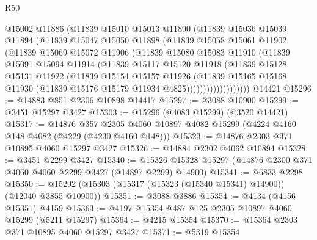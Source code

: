 \begin{lexlean}{R50}
\begin{coremodule}
                  @15002
                  @11886
                  (@11839
                    @15010
                    @15013
                    @11890
                    (@11839
                      @15036
                      @15039
                      @11894
                      (@11839
                        @15047
                        @15050
                        @11898
                        (@11839
                          @15058
                          @15061
                          @11902
                          (@11839
                            @15069
                            @15072
                            @11906
                            (@11839
                              @15080
                              @15083
                              @11910
                              (@11839
                                @15091
                                @15094
                                @11914
                                (@11839
                                  @15117
                                  @15120
                                  @11918
                                  (@11839
                                    @15128
                                    @15131
                                    @11922
                                    (@11839
                                      @15154
                                      @15157
                                      @11926
                                      (@11839
                                        @15165
                                        @15168
                                        @11930
                                        (@11839 @15176 @15179 @11934 @4825)))))))))))))))))))
    @14421
@15296 := @14883 @851 @2306 @10898 @14417
@15297 := @3088 @10900
@15299 := @3451 @15297 @3427
@15303 := @15296 (@4083 @15299) (@3520 @14421)
@15317 := @14876
    @357
    @2305
    @4060
    @10897
    @4082
    @15299
    (@4224 @4160 @148 @4082 (@4229 (@4230 @4160 @148)))
@15323 := @14876 @2303 @371 @10895 @4060 @15297 @3427
@15326 := @14884 @2302 @4062 @10894
@15328 := @3451 @2299 @3427
@15340 := @15326 @15328 @15297 (@14876 @2300 @371 @4060 @4060 @2299 @3427 (@14897 @2299) @14900)
@15341 := @6833 @2298
@15350 := @15292 (@15303 (@15317 (@15323 (@15340 @15341) @14900)) (@12040 @3855 @10900))
@15351 := @3088 @3886
@15354 := @4134 (@4156 @15351) @4159
@15363 := @4197 @15354 @487 @125 @2305 @10897 @4060 @15299 (@5211 @15297)
@15364 := @4215 @15354
@15370 := @15364 @2303 @371 @10895 @4060 @15297 @3427
@15371 := @5319 @15354

\end{coremodule}
\end{lexlean}
